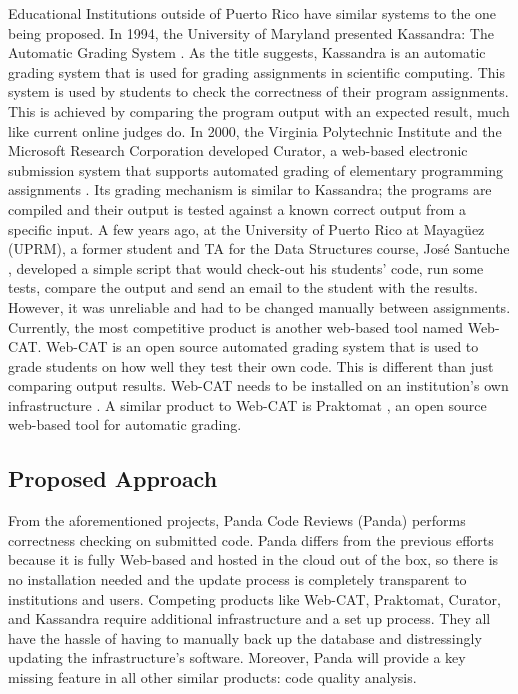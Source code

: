 Educational Institutions outside of Puerto Rico have similar systems to the one
being proposed. In 1994, the University of Maryland presented Kassandra: The
Automatic Grading System \cite{Matt1994}. As the title suggests, Kassandra is an
automatic grading system that is used for grading assignments in scientific
computing. This system is used by students to check the correctness of their
program assignments. This is achieved by comparing the program output with an
expected result, much like current online judges do. In 2000, the Virginia
Polytechnic Institute and the Microsoft Research Corporation developed Curator,
a web-based electronic submission system that supports automated grading of
elementary programming assignments \cite{Curator}. Its grading mechanism is
similar to Kassandra; the programs are compiled and their output is tested
against a known correct output from a specific input. A few years ago, at the
University of Puerto Rico at Mayagüez (UPRM), a former student and TA for the
Data  Structures course, José Santuche \cite{Santuche}, developed a simple
script that would check-out his students' code, run some tests, compare the
output and send an email to the student with the results. However, it was
unreliable and had to be changed manually between assignments. Currently, the
most competitive product is another web-based tool named Web-CAT. Web-CAT is an
open source automated grading system that is used to grade students on how well
they test their own code. This is different than just comparing output results.
Web-CAT needs to be installed on an institution's own infrastructure
\cite{WebCat}. A similar product to Web-CAT is Praktomat \cite{Praktomat}, an
open source web-based tool for automatic grading.

\subsection{Proposed Approach}

From the aforementioned projects, Panda Code Reviews (Panda) performs
correctness checking on submitted code. Panda differs from the previous efforts
because it is fully Web-based and hosted in the cloud out of the box, so there
is no installation needed and the update process is completely transparent to
institutions and users. Competing products like Web-CAT, Praktomat, Curator, and
Kassandra require additional infrastructure and a set up process. They all have
the hassle of having to manually back up the database and distressingly updating
the infrastructure's software. Moreover, Panda will provide a key missing
feature in all other similar products: code quality analysis.

